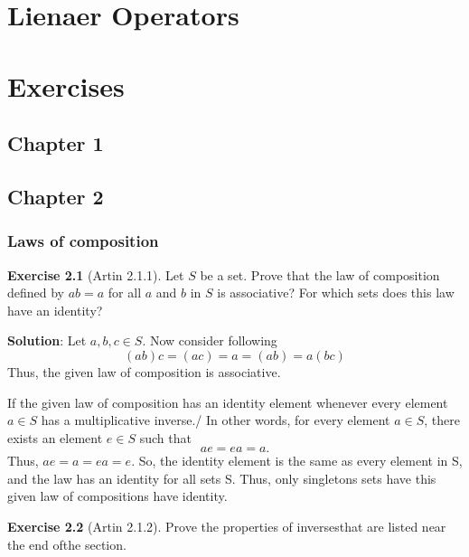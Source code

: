 \documentclass[
]{book}
\theoremstyle{definition}
\theoremstyle{definition}
\theoremstyle{definition}
\newtheorem{exercise}{Exercise}[chapter]
\theoremstyle{definition}
\theoremstyle{remark}
\begin{document}
\hypertarget{lienaer-operators}{%
\chapter{Lienaer Operators}\label{lienaer-operators}}

\hypertarget{exercises}{%
\chapter{Exercises}\label{exercises}}

\hypertarget{chapter-1}{%
\section{Chapter 1}\label{chapter-1}}

\hypertarget{chapter-2}{%
\section{Chapter 2}\label{chapter-2}}

\hypertarget{laws-of-composition}{%
\subsection{Laws of composition}\label{laws-of-composition}}

\begin{exercise}[Artin 2.1.1]
\protect\hypertarget{exr:unnamed-chunk-64}{}\label{exr:unnamed-chunk-64}Let \(S\) be a set. Prove that the law of composition defined by \(ab = a\) for all \(a\) and \(b\) in \(S\) is associative? For which sets does this law have an identity?
\end{exercise}

\textbf{Solution}: Let \(a,b,c\in S\).
Now consider following
\[(ab)c=(ac)=a=(ab)=a(bc)\]
Thus, the given law of composition is associative.

If the given law of composition has an identity element whenever every element \(a\in S\) has a multiplicative inverse./
In other words, for every element \(a\in S\), there exists an element \(e \in S\) such that \[ae = ea = a.\]
Thus, \(ae=a=ea=e\). So, the identity element is the same as every element in S, and the law has an identity for all sets S. Thus, only singletons sets have this given law of compositions have identity.

\begin{exercise}[Artin 2.1.2]
\protect\hypertarget{exr:unnamed-chunk-65}{}\label{exr:unnamed-chunk-65}Prove the properties of inversesthat are listed near the end ofthe section.
\end{exercise}
\end{document}
